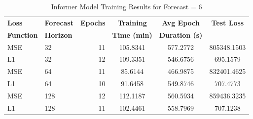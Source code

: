 \documentclass{article}
\begin{document}
\begin{table}
    \centering
    \caption{Informer Model Training Results for Forecast = 6}
    \begin{tabular}{l|l|r|S|S|S}
        \toprule
        \textbf{Loss} & \textbf{Forecast} & \textbf{Epochs} & \textbf{Training} & \textbf{Avg Epoch} & \textbf{Test Loss} \\
        \textbf{Function} & \textbf{Horizon} & & \textbf{Time (min)} & \textbf{Duration (s)} & \\
        \midrule
        MSE & 32 & 11 & 105.8341 & 577.2772 & 805348.1503 \\
        L1 & 32 & 12 & 109.3351 & 546.6756 & 695.1579 \\
        \midrule
        MSE & 64 & 11 & 85.6144 & 466.9875 & 832401.4625 \\
        L1 & 64 & 10 & 91.6458 & 549.8746 & 707.4773 \\
        \midrule
        MSE & 128 & 12 & 112.1187 & 560.5934 & 859436.3235 \\
        L1 & 128 & 11 & 102.4461 & 558.7969 & 707.1238 \\
      \bottomrule
    \end{tabular}
    \label{tab:informer_training_f6}
    \end{table}

\end{document}

